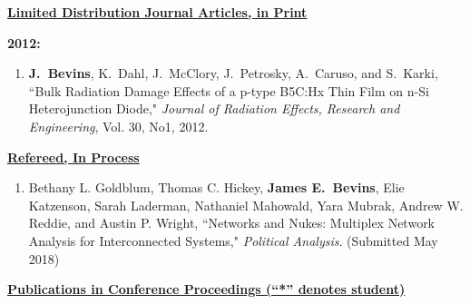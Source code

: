 
\underline{\textbf{Limited Distribution Journal Articles, in Print }}

\textbf{2012:}
\begin{enumerate}
  \item \textbf{J.\ Bevins}, K.\ Dahl, J.\ McClory, J.\ Petrosky, A.\ Caruso, and S.\ Karki, ``Bulk Radiation Damage Effects of a p-type B5C:Hx Thin Film on n-Si Heterojunction Diode," \textit{Journal of Radiation Effects, Research and Engineering}, Vol. 30, No1, 2012.
\end{enumerate}


\underline{\textbf{Refereed, In Process}}

\begin{enumerate}
  
  \item Bethany L. Goldblum, Thomas C. Hickey, \textbf{James E.\ Bevins}, Elie Katzenson, Sarah Laderman, Nathaniel Mahowald, Yara Mubrak, Andrew W. Reddie, and Austin P. Wright, ``Networks and Nukes: Multiplex Network Analysis for Interconnected Systems," \textit{Political Analysis}. (Submitted May 2018)
  
\end{enumerate}


\underline{\textbf{Publications in Conference Proceedings (“*” denotes student)}}

